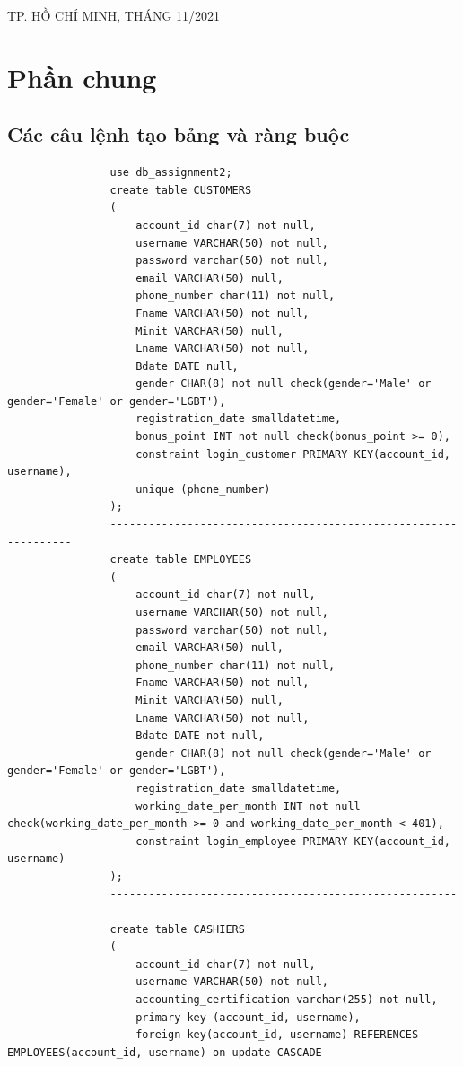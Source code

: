 \documentclass[13pt,a4paper]{article}
\begin{document}
\begin{titlepage}
		\vspace{0.3 cm}
		\begin{center}
			{\footnotesize\normalsize TP. HỒ CHÍ MINH, THÁNG 11/2021}
		\end{center}
	\end{titlepage}
	
	
	\newpage
	\tableofcontents
	\newpage
	
	
	\section{Phần chung}
		\subsection{Các câu lệnh tạo bảng và ràng buộc}
			\begin{lstlisting}
				use db_assignment2;
				create table CUSTOMERS
				(
					account_id char(7) not null,
					username VARCHAR(50) not null,
					password varchar(50) not null,
					email VARCHAR(50) null,
					phone_number char(11) not null,
					Fname VARCHAR(50) not null,
					Minit VARCHAR(50) null,
					Lname VARCHAR(50) not null,
					Bdate DATE null,
					gender CHAR(8) not null check(gender='Male' or gender='Female' or gender='LGBT'),
					registration_date smalldatetime,
					bonus_point INT not null check(bonus_point >= 0),
					constraint login_customer PRIMARY KEY(account_id, username),
					unique (phone_number)
				);				
				----------------------------------------------------------------				
				create table EMPLOYEES
				(
					account_id char(7) not null,
					username VARCHAR(50) not null,
					password varchar(50) not null,
					email VARCHAR(50) null,
					phone_number char(11) not null,
					Fname VARCHAR(50) not null,
					Minit VARCHAR(50) null,
					Lname VARCHAR(50) not null,
					Bdate DATE not null,
					gender CHAR(8) not null check(gender='Male' or gender='Female' or gender='LGBT'),
					registration_date smalldatetime,
					working_date_per_month INT not null check(working_date_per_month >= 0 and working_date_per_month < 401),
					constraint login_employee PRIMARY KEY(account_id, username)
				);				
				----------------------------------------------------------------				
				create table CASHIERS
				(
					account_id char(7) not null,
					username VARCHAR(50) not null,
					accounting_certification varchar(255) not null,
					primary key (account_id, username),
					foreign key(account_id, username) REFERENCES EMPLOYEES(account_id, username) on update CASCADE

\end{lstlisting}
\end{document}
